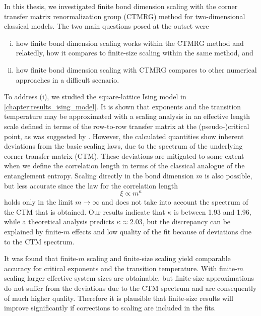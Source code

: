 In this thesis, we investigated finite bond dimension scaling with the corner transfer matrix renormalization group
(CTMRG) method for two-dimensional classical models.
The two main questions posed at the outset were
\begin{enumerate}[(i)]
  \item how finite bond dimension scaling works within the CTMRG method
  and relatedly, how it compares to finite-size scaling within the same method, and
  \item how finite bond dimension scaling with CTMRG compares to other numerical approaches in a difficult scenario.
\end{enumerate}

To address (i), we studied the square-lattice Ising model in \autoref{chapter:results_ising_model}.
It is shown that exponents and the transition temperature may be approximated with a scaling analysis in an effective
length scale defined in terms of the row-to-row transfer matrix at the (pseudo-)critical point,
as was suggested by \cite{nishino1996numerical}.
However, the calculated quantities show inherent deviations from the basic scaling laws,
due to the spectrum of the underlying corner transfer matrix (CTM).
These deviations are mitigated to some extent when we define the correlation length in terms of the classical analogue
of the entanglement entropy.
Scaling directly in the bond dimension $m$ is also possible, but less accurate since the law for the correlation
length
\begin{equation*}
  \xi \propto m^{\kappa}
\end{equation*}
holds only in the limit $m \to \infty$ and does not take into account the spectrum of the CTM that is obtained.
Our results indicate that $\kappa$ is between 1.93 and 1.96, while a theoretical analysis \cite{pollmann2009theory}
predicts $\kappa \approx 2.03$, but the discrepancy can be explained by finite-$m$ effects and low quality of the fit
because of deviations due to the CTM spectrum.

It was found that finite-$m$ scaling and finite-size scaling yield comparable accuracy for critical exponents and the
transition temperature.
With finite-$m$ scaling larger effective system sizes are obtainable,
but finite-size approximations do not suffer from the deviations due to the CTM spectrum and are
consequently of much higher quality. Therefore it is plausible that finite-size results will improve significantly if
corrections to scaling are included in the fits.

